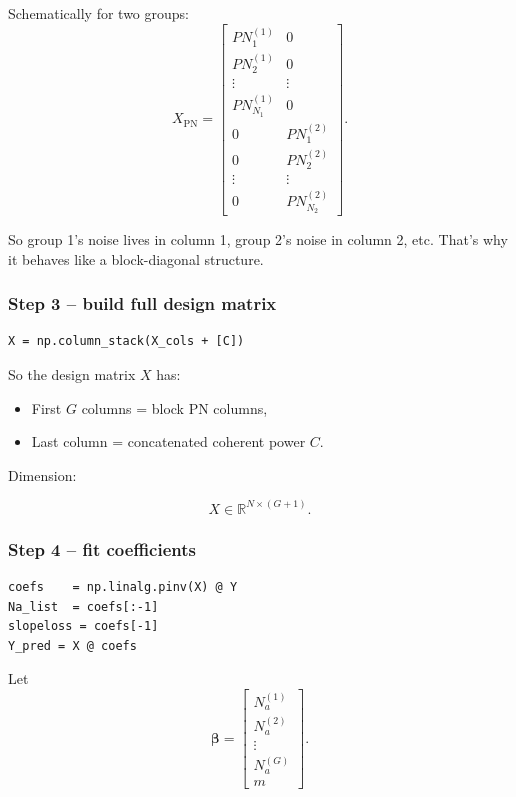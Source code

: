 \documentclass[11pt]{article}
\begin{document}
Schematically for two groups:
\[
  X_{\mathrm{PN}} =
  \begin{bmatrix}
    PN^{(1)}_1 & 0 \\
    PN^{(1)}_2 & 0 \\
    \vdots      & \vdots \\
    PN^{(1)}_{N_1} & 0 \\
    0 & PN^{(2)}_1 \\
    0 & PN^{(2)}_2 \\
    \vdots & \vdots \\
    0 & PN^{(2)}_{N_2}
  \end{bmatrix}.
\]

So group 1’s noise lives in column 1, group 2’s noise in column 2, etc. That’s why it behaves like a block-diagonal structure.

\subsubsection*{Step 3 -- build full design matrix}

\begin{verbatim}
X = np.column_stack(X_cols + [C])
\end{verbatim}

So the design matrix $X$ has:

\begin{itemize}[leftmargin=*]
  \item First $G$ columns = block PN columns,
  \item Last column = concatenated coherent power $C$.
\end{itemize}

Dimension:

\[
  X \in \mathbb{R}^{N \times (G+1)}.
\]

\subsubsection*{Step 4 -- fit coefficients}

\begin{verbatim}
coefs    = np.linalg.pinv(X) @ Y
Na_list  = coefs[:-1]
slopeloss = coefs[-1]
Y_pred = X @ coefs
\end{verbatim}

Let
\[
  \boldsymbol{\beta} =
  \begin{bmatrix}
    N_a^{(1)} \\ N_a^{(2)} \\ \vdots \\ N_a^{(G)} \\ m
  \end{bmatrix}.
\]
\end{document}
